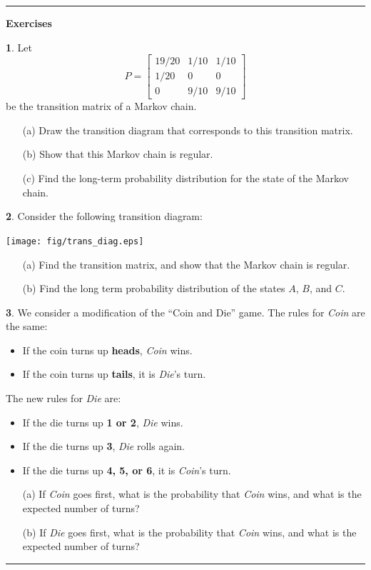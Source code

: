 \documentclass[reqno]{immbook}
\numberwithin{equation}{chapter}
\numberwithin{question}{section}
\numberwithin{theorem}{chapter}
\numberwithin{figure}{chapter}
\theoremstyle{definition}
\newtheorem{exercise}{}[section]
\newenvironment{exercises}%
{%
\medskip\hrule\medskip\noindent\textbf{Exercises}%
}%
{%
\medskip\hrule
}
\begin{document}
\begin{exercises}
\begin{exercise}
\label{ex:markov1}
Let
\begin{equation}
  P = \begin{bmatrix}
           19/20 & 1/10 & 1/10 \\
	   1/20 & 0   & 0   \\
	   0    & 9/10 & 9/10
      \end{bmatrix}
\end{equation}
be the transition matrix of a Markov chain.
\begin{enumerate}
\item[(a)]
Draw the transition diagram that corresponds to this transition matrix.
\item[(b)]
Show that this Markov chain is regular.
\item[(c)]
Find the long-term probability distribution for the state of the Markov
chain.
\end{enumerate}
\end{exercise}

\begin{exercise}
\label{ex:markov2}
Consider the following transition diagram:

\medskip
\centerline{%
\texttt{[image: fig/trans\_diag.eps]}
}
\begin{enumerate}
\item[(a)] Find the transition matrix,
and show that the Markov chain is regular.
\item[(b)]  Find the long term probability distribution of the states
$A$, $B$, and $C$.
\end{enumerate}
\end{exercise}

%
\begin{exercise}
\label{ex:markov3}
We consider a modification of the ``Coin and Die'' game.
The rules for \emph{Coin} are the same:
\begin{itemize}
\item If the coin turns up \textbf{heads}, \emph{Coin} wins.
\item If the coin turns up \textbf{tails}, it is \emph{Die}'s turn.
\end{itemize}
The new rules for \emph{Die} are:
\begin{itemize}
\item If the die turns up \textbf{1 or 2}, \emph{Die} wins.
\item If the die turns up \textbf{3}, \emph{Die} rolls again.
\item If the die turns up \textbf{4, 5, or 6}, it is \emph{Coin}'s turn.
\end{itemize}
\begin{enumerate}
\item[(a)] If \emph{Coin} goes first, what is the probability that
\emph{Coin} wins, and what is the expected number of turns?
\item[(b)] If \emph{Die} goes first, what is the probability that
\emph{Coin} wins, and what is the expected number of turns?
\end{enumerate}
\end{exercise}
\end{exercises}
\end{document}
